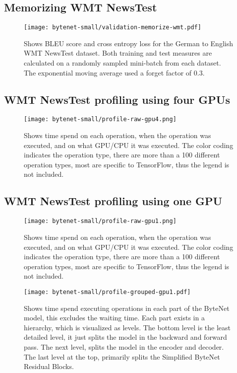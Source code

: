 \subsection{Memorizing WMT NewsTest}
\begin{figure}[h]
    \centering
    \texttt{[image: bytenet-small/validation-memorize-wmt.pdf]}
    \caption{Shows BLEU score and cross entropy loss for the German to English WMT NewsTest dataset. Both training and test measures are calculated on a randomly sampled mini-batch from each dataset. The exponential moving average used a forget factor of $0.3$.}
\end{figure}
\clearpage

\subsection{WMT NewsTest profiling using four GPUs}
\begin{figure}[h]
    \centering
    \texttt{[image: bytenet-small/profile-raw-gpu4.png]}
    \caption{Shows time spend on each operation, when the operation was executed, and on what GPU/CPU it was executed. The color coding indicates the operation type, there are more than a 100 different operation types, most are specific to TensorFlow, thus the legend is not included.}
\end{figure}
\clearpage


\subsection{WMT NewsTest profiling using one GPU}
\begin{figure}[h]
    \centering
    \texttt{[image: bytenet-small/profile-raw-gpu1.png]}
    \caption{Shows time spend on each operation, when the operation was executed, and on what GPU/CPU it was executed. The color coding indicates the operation type, there are more than a 100 different operation types, most are specific to TensorFlow, thus the legend is not included.}
\end{figure}

\begin{figure}[h]
    \centering
    \texttt{[image: bytenet-small/profile-grouped-gpu1.pdf]}
    \caption{Shows time spend executing operations in each part of the ByteNet model, this excludes the waiting time. Each part exists in a hierarchy, which is visualized as levels. The bottom level is the least detailed level, it just splits the model in the backward and forward pass. The next level, splits the model in the encoder and decoder. The last level at the top, primarily splits the Simplified ByteNet Residual Blocks.}
\end{figure}

